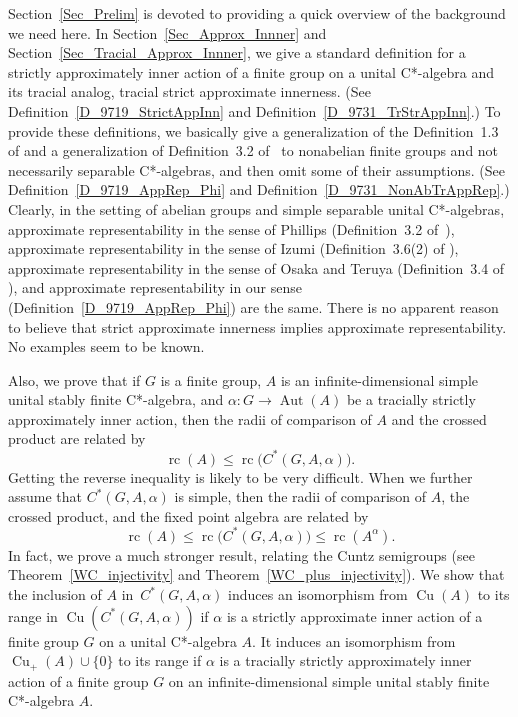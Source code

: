 \documentclass[10pt]{amsart}
\numberwithin{equation}{section}
\theoremstyle{definition}
\newcommand{\af}{\alpha}
\newcommand{\Cu}{{\operatorname{Cu}}}
\newcommand{\Aut}{{\operatorname{Aut}}}
\newcommand{\rc}{{\operatorname{rc}}}
\newcommand{\CGAa}{C^* (G, A, \af)}
\begin{document}
Section~{\ref{Sec_Prelim}} is devoted to
 providing a quick overview of the background we need here. In Section~\ref{Sec_Approx_Innner} and Section~\ref{Sec_Tracial_Approx_Innner}, we give a standard definition for 
a strictly approximately inner action of a finite group on a unital C*-algebra
and its tracial analog, tracial strict approximate innerness.
 (See Definition~\ref{D_9719_StrictAppInn} and Definition~\ref{D_9731_TrStrAppInn}.)
To provide these definitions, we basically  give 
a generalization of the Definition~1.3 of \cite{Ph15}
and 
a  generalization of Definition~3.2 of~\cite{Ph11}
to nonabelian finite groups and not necessarily separable C*-algebras, and then omit some of their assumptions. 
(See Definition~\ref{D_9719_AppRep_Phi} and Definition~\ref{D_9731_NonAbTrAppRep}.)
Clearly, in the setting of abelian groups and  simple  separable unital C*-algebras,
approximate representability in the sense of Phillips (Definition~3.2 of~\cite{Ph11}),
approximate representability in the sense of Izumi (Definition~3.6(2) of \cite{Iz1}),
approximate representability in the sense of Osaka and Teruya (Definition~3.4 of \cite{LO19}),
and
approximate representability in our sense (Definition~\ref{D_9719_AppRep_Phi}) are the same.
There is no apparent reason to
believe that strict approximate innerness implies approximate
representability. 
No examples seem to be known.

Also, we prove that if $G$ is a finite group, $A$ is an infinite-dimensional simple  unital stably finite C*-algebra,
and $\alpha \colon  G \to \Aut(A)$ be a tracially strictly  approximately  inner action, then 
the radii of comparison of $A$ and 
the crossed product are related by
\[
\rc (A) \leq \rc \big( \CGAa\big).
\]
Getting the reverse inequality is likely to be very difficult.
When we further assume that $C^*(G, A, \alpha)$ is simple, then
the radii of comparison of $A$, the crossed product, and the fixed point algebra
are related by
\[
\rc (A) \leq \rc \big(C^*(G, A, \alpha)\big) \leq \rc (A^{\alpha}).
\]   
%
In fact,
we prove a much stronger result,
relating the Cuntz semigroups
(see Theorem~\ref{WC_injectivity} and Theorem~\ref{WC_plus_injectivity}).
We show that
the inclusion of $A$ in~$C^*(G, A, \alpha)$
induces an isomorphism from $\Cu (A)$  to its range in $\Cu (C^*(G, A, \alpha))$
if $\alpha$ is a strictly approximate inner action of a finite group $G$ on a unital C*-algebra $A$.
It induces an isomorphism from  $\Cu_+ (A) \cup \{0\}$ to its range 
if $\alpha$ is a tracially  strictly approximately inner action of a finite group $G$ 
on an infinite-dimensional simple  unital stably finite C*-algebra $A$.
   
\end{document}
